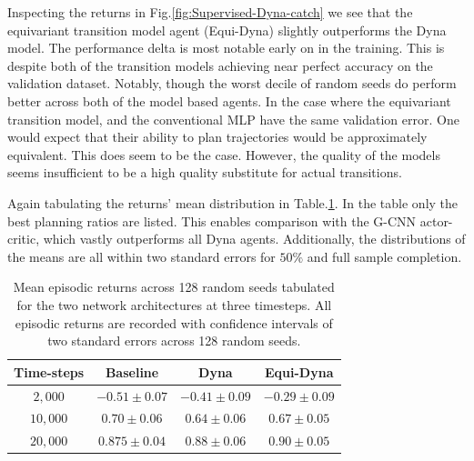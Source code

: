 Inspecting the returns in Fig.\ref{fig:Supervised-Dyna-catch} we see that the equivariant transition model agent (Equi-Dyna) slightly outperforms the Dyna model. The performance delta is most notable early on in the training. This is despite both of the transition models achieving near perfect accuracy on the validation dataset. Notably, though the worst decile of random seeds do perform better across both of the model based agents. In the case where the equivariant transition model, and the conventional MLP have the same validation error. One would expect that their ability to plan trajectories would be approximately equivalent. This does seem to be the case. However, the quality of the models seems insufficient to be a high quality substitute for actual transitions.

Again tabulating the returns' mean distribution in Table.\ref{tab:Supervised-Dyna-catch}. In the table only the best planning ratios are listed. This enables comparison with the G-CNN actor-critic, which vastly outperforms all Dyna agents. Additionally, the distributions of the means are all within two standard errors for $50 \%$ and full sample completion.

\begin{table}
	\centering
	\begin{tabular}{|c|c|c|c|}
		\hline
		Time-steps & Baseline         & Dyna             & Equi-Dyna                 \\
		\hline
		$2, 000$   & $- 0.51\pm 0.07$ & $-0.41 \pm 0.09$ & $\mathbf{-0.29\pm 0.09}$  \\
		$10, 000$  & $0.70 \pm 0.06$  & $0.64\pm 0.06 $  & $\mathbf{0.67 \pm 0.05} $ \\
		$20,000$   & $0.875 \pm 0.04$ & $0.88\pm 0.06$   & $\mathbf{0.90\pm 0.05}$   \\
		\hline
	\end{tabular}
	\caption{Mean episodic returns across 128 random seeds tabulated for the two network architectures at three timesteps. All episodic returns are recorded with confidence intervals of two standard errors across 128 random seeds.}
	\label{tab:Supervised-Dyna-catch}
\end{table}

